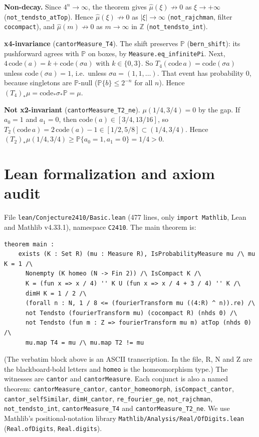 \documentclass[11pt]{article}
\theoremstyle{definition}
\begin{document}
\textbf{Non-decay.} Since $4^n\to\infty$, the theorem gives $\hat\mu(\xi)\not\to0$ as
$\xi\to+\infty$ (\texttt{not\_tendsto\_atTop}). Hence $\hat\mu(\xi)\not\to0$ as $|\xi|\to\infty$
(\texttt{not\_rajchman}, filter \texttt{cocompact}), and $\hat\mu(m)\not\to0$ as $m\to\infty$ in
$\mathbb{Z}$ (\texttt{not\_tendsto\_int}).

\textbf{x4-invariance} (\texttt{cantorMeasure\_T4}). The shift preserves $\mathbb{P}$
(\texttt{bern\_shift}): its pushforward agrees with $\mathbb{P}$ on boxes, by
\texttt{Measure.eq\_infinitePi}. Next, $4\,\mathrm{code}(a)=k+\mathrm{code}(\sigma a)$ with
$k\in\{0,3\}$. So $T_4(\mathrm{code}\,a)=\mathrm{code}(\sigma a)$ unless $\mathrm{code}(\sigma a)=1$,
i.e.\ unless $\sigma a=(1,1,\dots)$. That event has probability $0$, because singletons are
$\mathbb{P}$-null ($\mathbb{P}\{b\}\le2^{-n}$ for all $n$). Hence
$(T_4)_*\mu=\mathrm{code}_*\sigma_*\mathbb{P}=\mu$.

\textbf{Not x2-invariant} (\texttt{cantorMeasure\_T2\_ne}). $\mu(1/4,3/4)=0$ by the gap. If
$a_0=1$ and $a_1=0$, then $\mathrm{code}(a)\in[3/4,13/16]$, so
$T_2(\mathrm{code}\,a)=2\,\mathrm{code}(a)-1\in[1/2,5/8]\subset(1/4,3/4)$. Hence
$(T_2)_*\mu(1/4,3/4)\ge\mathbb{P}\{a_0=1,a_1=0\}=1/4>0$.

\section{Lean formalization and axiom audit}

File \texttt{lean/Conjecture2410/Basic.lean} (477 lines, only \texttt{import Mathlib}, Lean and Mathlib
v4.33.1), namespace \texttt{C2410}. The main theorem is:
\begin{verbatim}
theorem main :
    exists (K : Set R) (mu : Measure R), IsProbabilityMeasure mu /\ mu K = 1 /\
      Nonempty (K homeo (N -> Fin 2)) /\ IsCompact K /\
      K = (fun x => x / 4) '' K U (fun x => x / 4 + 3 / 4) '' K /\
      dimH K = 1 / 2 /\
      (forall n : N, 1 / 8 <= (fourierTransform mu ((4:R) ^ n)).re) /\
      not Tendsto (fourierTransform mu) (cocompact R) (nhds 0) /\
      not Tendsto (fun m : Z => fourierTransform mu m) atTop (nhds 0) /\
      mu.map T4 = mu /\ mu.map T2 != mu
\end{verbatim}
(The verbatim block above is an ASCII transcription. In the file, R, N and Z are the blackboard-bold
letters and \texttt{homeo} is the homeomorphism type.) The witnesses are \texttt{cantor} and
\texttt{cantorMeasure}. Each conjunct is also a named theorem:
\texttt{cantorMeasure\_cantor}, \texttt{cantor\_homeomorph}, \texttt{isCompact\_cantor},
\texttt{cantor\_selfSimilar}, \texttt{dimH\_cantor}, \texttt{re\_fourier\_ge},
\texttt{not\_rajchman}, \texttt{not\_tendsto\_int}, \texttt{cantorMeasure\_T4} and
\texttt{cantorMeasure\_T2\_ne}. We use Mathlib's positional-notation library
\texttt{Mathlib/Analysis/Real/OfDigits.lean} (\texttt{Real.ofDigits}, \texttt{Real.digits}).
\end{document}
